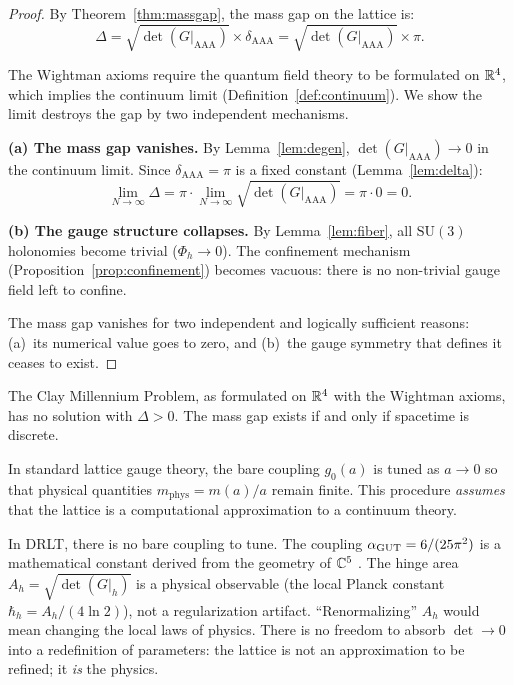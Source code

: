 \begin{proof}
By Theorem~\ref{thm:massgap}, the mass gap on the lattice is:
\begin{equation}
\Delta = \sqrt{\det(G|_{\mathrm{AAA}})} \times \delta_{\mathrm{AAA}}
= \sqrt{\det(G|_{\mathrm{AAA}})} \times \pi.
\end{equation}

The Wightman axioms require the quantum field theory to be formulated on
$\mathbb{R}^4$, which implies the continuum limit
(Definition~\ref{def:continuum}).  We show the limit destroys the gap
by two independent mechanisms.

\medskip\noindent
\textbf{(a) The mass gap vanishes.}
By Lemma~\ref{lem:degen}, $\det(G|_{\mathrm{AAA}}) \to 0$ in the
continuum limit.  Since $\delta_{\mathrm{AAA}} = \pi$ is a fixed
constant (Lemma~\ref{lem:delta}):
\begin{equation}
\lim_{N \to \infty} \Delta
= \pi \cdot \lim_{N \to \infty} \sqrt{\det(G|_{\mathrm{AAA}})}
= \pi \cdot 0 = 0.
\end{equation}

\medskip\noindent
\textbf{(b) The gauge structure collapses.}
By Lemma~\ref{lem:fiber}, all $\mathrm{SU}(3)$ holonomies become
trivial ($\Phi_h \to 0$).  The confinement mechanism
(Proposition~\ref{prop:confinement}) becomes vacuous: there is no
non-trivial gauge field left to confine.

\medskip\noindent
The mass gap vanishes for two independent and logically sufficient
reasons: (a)~its numerical value goes to zero, and (b)~the gauge
symmetry that defines it ceases to exist.
\end{proof}

\begin{corollary}
The Clay Millennium Problem, as formulated on $\mathbb{R}^4$ with the
Wightman axioms, has no solution with $\Delta > 0$. The mass gap exists
if and only if spacetime is discrete.
\end{corollary}

\begin{remark}
In standard lattice gauge theory, the bare coupling $g_0(a)$ is tuned as
$a \to 0$ so that physical quantities $m_{\mathrm{phys}} = m(a)/a$
remain finite. This procedure \emph{assumes} that the lattice is a
computational approximation to a continuum theory.

In DRLT, there is no bare coupling to tune. The coupling
$\alpha_{\mathrm{GUT}} = 6/(25\pi^2)$ is a mathematical constant
derived from the geometry of $\mathbb{C}^5$ . The hinge
area $A_h = \sqrt{\det(G|_h)}$ is a physical observable (the local
Planck constant $\hbar_h = A_h/(4\ln 2)$), not a regularization
artifact. ``Renormalizing'' $A_h$ would mean changing the local laws of
physics. There is no freedom to absorb $\det \to 0$ into a redefinition
of parameters: the lattice is not an approximation to be refined; it
\emph{is} the physics.
\end{remark}

